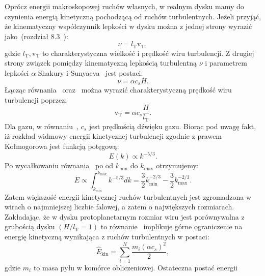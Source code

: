 \par Oprócz energii
makroskopowej ruchów własnych, w realnym dysku mamy do czynienia energią
kinetyczną pochodzącą od ruchów turbulentnych.  Jeżeli przyjąć, że kinematyczny
współczynnik lepkości w dysku można z jednej strony wyrazić jako~(rozdział
8.3~\cite{C98}):
%
\begin{equation}
   \nu = l_{\textrm{T}} \textrm{v}_{\textrm{T}},
   \label{eq:nu1}
\end{equation}
%
gdzie $l_{\textrm{T}}, \textrm{v}_{\textrm{T}}$ to charakterystyczna wielkość i prędkość
wiru turbulencji. Z drugiej strony 
związek pomiędzy kinematyczną lepkością turbulentną $\nu$ i parametrem lepkości
$\alpha$ Shakury i Sunyaeva~\cite{SS73} jest postaci:
%
\begin{equation}
   \nu = \alpha c_s H.
   \label{eq:nu2}
\end{equation}
%
Łącząc równania~ oraz~ można wyrazić charakterystyczną
prędkość wiru turbulencji poprzez:
%
\begin{equation}
   \textrm{v}_{\textrm{T}} = \alpha c_s \frac{H}{l_{\textrm{T}}}.
   \label{eq:velt}
\end{equation}
%
Dla gazu, w równaniu~, $c_s$ jest prędkością dźwięku gazu.
Biorąc pod uwagę fakt, iż rozkład widmowy energii kinetycznej turbulencji
zgodnie z prawem Kołmogorowa jest funkcją potęgową:
\begin{equation}
   E(k) \propto k^{-5/3}.
   \label{eq:ek}
\end{equation}
Po wycałkowaniu równania~ po od $k_\textrm{min}$ do $k_\textrm{max}$
otrzymujemy:
\begin{equation}
   E \propto \int_{k_\textrm{min}}^{k_\textrm{max}} k^{-5/3} dk = \frac{3}{2}
   k_\textrm{min}^{-2/3} -\frac{3}{2}k_\textrm{max}^{-2/3}.
\end{equation}
Zatem większość energii kinetycznej ruchów turbulentnych jest zgromadzona w wirach
o najmniejszej liczbie falowej, a zatem o największych rozmiarach. Zakładając,
że w dysku protoplanetarnym rozmiar wiru jest porównywalna z grubością dysku $(H
/ l_{\textrm{T}} = 1)$ to równanie~ implikuje górne ograniczenie
na energię kinetyczną wynikająca z ruchów turbulentnych w postaci:
\begin{equation}
   \hat{E}_{\textrm{kin}} = \sum\limits_{i=1}^N \frac{m_i \left(\alpha
   c_s\right)^2}{2},
   \label{eq:ekinturb}
\end{equation}
gdzie $m_i$ to masa pyłu w komórce obliczeniowej. Ostateczna postać energii
